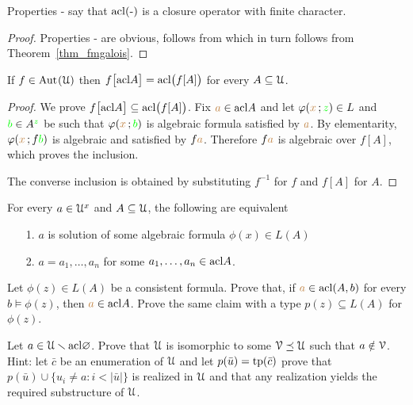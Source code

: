 Properties - say that ${\rm acl}(\mbox{-})$ is a closure operator with finite character.

\begin{proof}
Properties - are obvious,  follows from  which in turn follows from Theorem~\ref{thm_fmgalois}.
\end{proof}

\begin{proposition}\label{prop_estensionemappechiusuraalgebrica}
If $f\in{\rm Aut\kern.15ex}(\EuScript U)$ then $f\big[{\rm acl} A\big]={\rm acl}\big(f[A]\big)$ for every $A\subseteq\EuScript U$.
\end{proposition}

\begin{proof}
We prove $f\big[{\rm acl} A\big]\subseteq{\rm acl}\big(f[A]\big)$.
Fix ${\color{brown} a}\in{\rm acl} A$ and let $\varphi({\color{brown} x}\,;{\color{green} z})\in L$ and ${\color{green} b}\in A^{\color{green} z}$ be such that 
$\varphi({\color{brown} x}\,;{\color{green} b})$ is algebraic formula satisfied by ${\color{brown} a}$.
By elementarity, $\varphi({\color{brown} x}\,;f{\color{green} b})$ is algebraic and satisfied by $f{\color{brown} a}$.
Therefore  $f{\color{brown} a}$ is algebraic over $f[A]$, which proves the inclusion.

The converse inclusion is obtained by substituting  $f^{-1}$ for $f$ and $f[A]$ for $A$.
\end{proof}

\begin{exercise}
  For every $a\in\EuScript U^{x}$ and $A\subseteq\EuScript U$, the following are equivalent
  \begin{itemize}
  \item[1.] $a$ is solution of some algebraic formula  $\phi(x)\in L(A)$
  \item[2.] $a=a_1,\dots,a_n$ for some $a_1,\dots,a_n\in{\rm acl} A$.
  \end{itemize}
  \end{exercise}
  
\begin{exercise}\label{pofu}
  Let $\phi(z)\in L(A)$ be a consistent formula.
  Prove that, if ${\color{brown} a}\in{\rm acl}(A,b)$ for every $b\models\phi(z)$, then ${\color{brown} a}\in{\rm acl} A$.
  Prove the same claim with a type $p(z)\subseteq L(A)$ for $\phi(z)$.
\end{exercise}

\begin{exercise}\label{ex_isosub}
Let $a\in\EuScript U\smallsetminus{\rm acl}\varnothing$.
Prove that $\EuScript U$ is isomorphic to some $\EuScript V\preceq \EuScript U$ such that $a\notin\EuScript V$.
Hint: let $\bar c$ be an enumeration of $\EuScript U$ and let $p(\bar u)={\rm tp}(\bar c)$ prove that 
$p(\bar u)\cup\big\{ u_i\neq a :i<|\bar u|\big\}$ is realized in $\EuScript U$ and 
that any realization yields the required substructure of $\EuScript U$.
\end{exercise}

